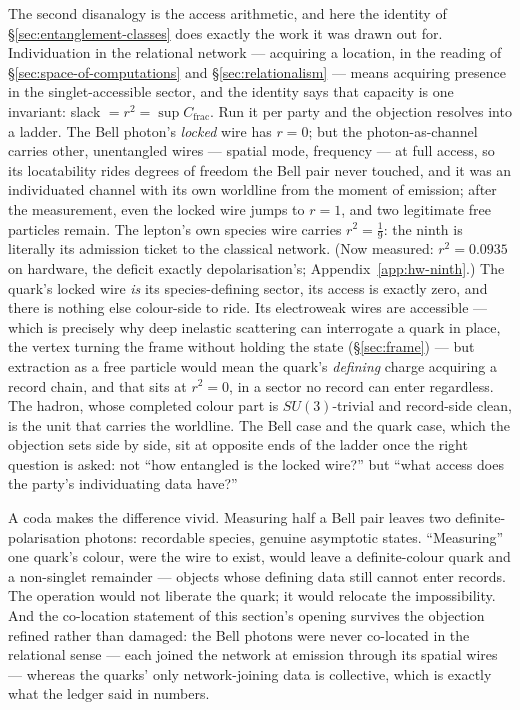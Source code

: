 The second disanalogy is the access arithmetic, and here the identity of
\S\ref{sec:entanglement-classes} does exactly the work it was drawn out for. Individuation in the
relational network --- acquiring a location, in the reading of \S\ref{sec:space-of-computations}
and \S\ref{sec:relationalism} --- means acquiring presence in the singlet-accessible sector, and
the identity says that capacity is one invariant: slack $= r^{2} = \sup C_{\mathrm{frac}}$. Run it
per party and the objection resolves into a ladder. The Bell photon's \emph{locked} wire has
$r = 0$; but the photon-as-channel carries other, unentangled wires --- spatial mode, frequency ---
at full access, so its locatability rides degrees of freedom the Bell pair never touched, and it
was an individuated channel with its own worldline from the moment of emission; after the
measurement, even the locked wire jumps to $r = 1$, and two legitimate free particles remain. The
lepton's own species wire carries $r^{2} = \tfrac19$: the ninth is literally its admission ticket
to the classical network. (Now measured: $r^{2} = 0.0935$ on hardware, the deficit exactly
depolarisation's; Appendix~\ref{app:hw-ninth}.) The quark's locked wire \emph{is} its species-defining sector, its
access is exactly zero, and there is nothing else colour-side to ride. Its electroweak wires are
accessible --- which is precisely why deep inelastic scattering can interrogate a quark in place,
the vertex turning the frame without holding the state (\S\ref{sec:frame}) --- but extraction as
a free particle would mean the quark's \emph{defining} charge acquiring a record chain, and that
sits at $r^{2} = 0$, in a sector no record can enter regardless. The hadron, whose completed colour
part is $SU(3)$-trivial and record-side clean, is the unit that carries the worldline. The Bell
case and the quark case, which the objection sets side by side, sit at opposite ends of the ladder
once the right question is asked: not ``how entangled is the locked wire?'' but ``what access does
the party's individuating data have?''

A coda makes the difference vivid. Measuring half a Bell pair leaves two definite-polarisation
photons: recordable species, genuine asymptotic states. ``Measuring'' one quark's colour, were the
wire to exist, would leave a definite-colour quark and a non-singlet remainder --- objects whose
defining data still cannot enter records. The operation would not liberate the quark; it would
relocate the impossibility. And the co-location statement of this section's opening survives the
objection refined rather than damaged: the Bell photons were never co-located in the relational
sense --- each joined the network at emission through its spatial wires --- whereas the quarks'
only network-joining data is collective, which is exactly what the ledger said in numbers.

